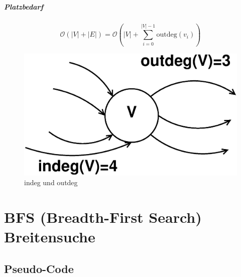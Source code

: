 \paragraph{Platzbedarf}
\[ \mathcal{O}(|V|+|E|)=\mathcal{O}\left( |V|+\sum_{i=0}^{|V|-1}\text{outdeg}(v_i) \right) \]
\begin{figure}[h]
\centering
\includegraphics[width=0.3\linewidth]{15/Grafik/deg}
\caption{indeg und outdeg}
\label{fig:deg}
\end{figure}

\chapter{BFS (Breadth-First Search) Breitensuche}
\section{Pseudo-Code} %
